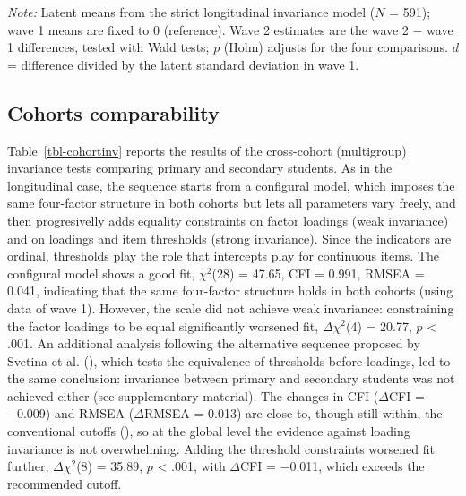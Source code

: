 \documentclass[
  13pt,
]{article}
\begin{document}
\vspace{-1.2em}\footnotesize \emph{Note:} Latent means from the strict
longitudinal invariance model (\(N\) = 591); wave 1 means are fixed to 0
(reference). Wave 2 estimates are the wave 2 − wave 1 differences,
tested with Wald tests; \(p\) (Holm) adjusts for the four comparisons.
\(d\) = difference divided by the latent standard deviation in wave 1.
\par\normalsize

\subsection{Cohorts comparability}\label{cohorts-comparability}

Table~\ref{tbl-cohortinv} reports the results of the cross-cohort
(multigroup) invariance tests comparing primary and secondary students.
As in the longitudinal case, the sequence starts from a configural
model, which imposes the same four-factor structure in both cohorts but
lets all parameters vary freely, and then progresivelly adds equality
constraints on factor loadings (weak invariance) and on loadings and
item thresholds (strong invariance). Since the indicators are ordinal,
thresholds play the role that intercepts play for continuous items. The
configural model shows a good fit, \(\chi^2\)(28) = 47.65, CFI = 0.991,
RMSEA = 0.041, indicating that the same four-factor structure holds in
both cohorts (using data of wave 1). However, the scale did not achieve
weak invariance: constraining the factor loadings to be equal
significantly worsened fit, \(\Delta \chi^2\)(4) = 20.77, \(p\)
\textless{} .001. An additional analysis following the alternative
sequence proposed by Svetina et al.
(), which tests the
equivalence of thresholds before loadings, led to the same conclusion:
invariance between primary and secondary students was not achieved
either (see supplementary material). The changes in CFI (\(\Delta\)CFI =
−0.009) and RMSEA (\(\Delta\)RMSEA = 0.013) are close to, though still
within, the conventional cutoffs
(), so at the global
level the evidence against loading invariance is not overwhelming.
Adding the threshold constraints worsened fit further,
\(\Delta \chi^2\)(8) = 35.89, \(p\) \textless{} .001, with \(\Delta\)CFI
= −0.011, which exceeds the recommended cutoff.
\end{document}
